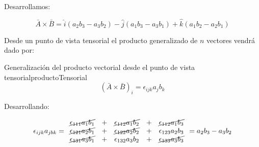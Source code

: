 Desarrollamos:

\begin{equation}
    \bar{A} \times \bar{B}= \hat{i}(a_2 b_3 - a_3 b_2) - \hat{j}(a_1 b_3 - a_3 b_1) + \hat{k}(a_1 b_2 - a_2 b_1)
\end{equation}

Desde un punto de vista tensorial el producto generalizado de $n$ vectores vendrá
dado por:

\begin{theorem}{Generalización del producto vectorial desde el punto de vista tensorial}{productoTensorial}
    \begin{equation}
        (\bar{A} \times \bar{B})_{i} = \epsilon_{ijk} a_{j} b_{k}
    \end{equation}
\end{theorem}

Desarrollando:

\begin{equation}
    \epsilon_{ijk} a_{jbk} =
    \begin{array}{ccccc}
        \cancel{\epsilon_{111} a_1 b_1} & + & \cancel{\epsilon_{112} a_1 b_2}   & + & \cancel{\epsilon_{112} a_1 b_3}   \\
        \cancel{\epsilon_{121} a_2 b_1} & + & \cancel{\epsilon_{122} a_2 b_2}   & + & \epsilon_{123} a_2 b_3            \\
        \cancel{\epsilon_{131} a_3 b_1} & + & \epsilon_{132} a_3 b_2            & + & \cancel{\epsilon_{133} a_3 b_3}
    \end{array}
    = a_2 b_3 - a_3 b_2
\end{equation}
